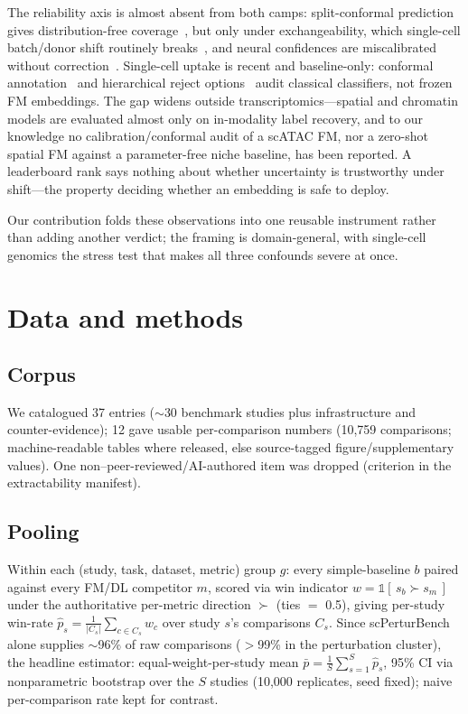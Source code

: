 \documentclass[journal]{IEEEtran}
\begin{document}
The reliability axis is almost absent from both camps: split-conformal prediction gives distribution-free coverage~\cite{vovk2005,angelopoulos2023}, but only under exchangeability, which single-cell batch/donor shift routinely breaks~\cite{barber2023}, and neural confidences are miscalibrated without correction~\cite{guo2017}. Single-cell uptake is recent and baseline-only: conformal annotation~\cite{lopezdecastro2025} and hierarchical reject options~\cite{theunissen2024} audit classical classifiers, not frozen FM embeddings. The gap widens outside transcriptomics---spatial and chromatin models are evaluated almost only on in-modality label recovery, and to our knowledge no calibration/conformal audit of a scATAC FM, nor a zero-shot spatial FM against a parameter-free niche baseline, has been reported. A leaderboard rank says nothing about whether uncertainty is trustworthy under shift---the property deciding whether an embedding is safe to deploy.

Our contribution folds these observations into one reusable instrument rather than adding another verdict; the framing is domain-general, with single-cell genomics the stress test that makes all three confounds severe at once.

\section{Data and methods}
\subsection{Corpus}
We catalogued 37 entries ($\sim$30 benchmark studies plus infrastructure and counter-evidence); 12 gave usable per-comparison numbers (10{,}759 comparisons; machine-readable tables where released, else source-tagged figure/supplementary values). One non--peer-reviewed/AI-authored item was dropped (criterion in the extractability manifest).
\subsection{Pooling}
Within each (study, task, dataset, metric) group $g$: every simple-baseline $b$ paired against every FM/DL competitor $m$, scored via win indicator $w=\mathbb{1}[\,s_b \succ s_m\,]$ under the authoritative per-metric direction $\succ$ (ties $=$ 0.5), giving per-study win-rate $\hat p_s = \frac{1}{|C_s|}\sum_{c\in C_s} w_c$ over study $s$'s comparisons $C_s$. Since scPerturBench~\cite{scperturbench2025} alone supplies ${\sim}$96\% of raw comparisons ($>$99\% in the perturbation cluster), the headline estimator: equal-weight-per-study mean $\bar p = \frac{1}{S}\sum_{s=1}^{S}\hat p_s$, 95\% CI via nonparametric bootstrap over the $S$ studies (10{,}000 replicates, seed fixed); naive per-comparison rate kept for contrast.
\end{document}
